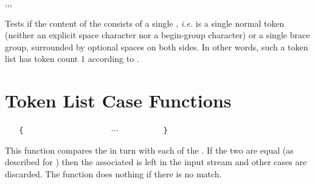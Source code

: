 \documentclass[oneside]{book}
\begin{document}
\begin{function}{\tlVarIfSingle,\tlVarIfSingleT,\tlVarIfSingleF,\tlVarIfSingleTF}
\begin{syntax}
 
  
  
   
\end{syntax}
Tests if the content of the  consists of a single ,
\emph{i.e.} is a single normal token (neither an explicit space
character nor a begin-group character) or a single brace group,
surrounded by optional spaces on both sides. In other words, such a
token list has token count $1$ according to .
\begin{demohigh}
\tlSet {}
\tlVarIfSingleTF {} {}
\tlSet {}
\tlVarIfSingleTF {} {}
\end{demohigh}
\end{function}

\section{Token List Case Functions}

\begin{function}{\tlVarCase}
\begin{syntax}
 
~ ~ \verb"{"
~ ~ ~ ~  
~ ~ ~ ~  
~ ~ ~ ~ $\cdots$
~ ~ ~ ~  
~ ~ \verb"}"
\end{syntax}
This function compares the  in turn
with each of the . If the two
are equal (as described for )
then the associated  is left in the input
stream and other cases are discarded. The function
does nothing if there is no match.
\begin{demohigh}
\IgnoreSpacesOn
\tlSet {}
\tlSet {}
\tlSet {}
\tlSet {}
\tlVarCase {}
\IgnoreSpacesOff
\end{demohigh}
\end{function}
\end{document}
